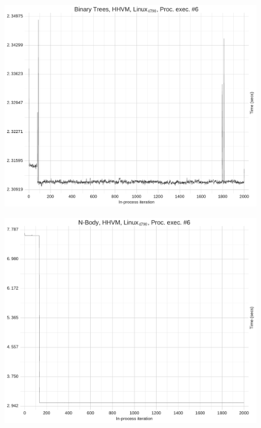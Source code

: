 \documentclass[preprint,numbers,10pt]{sigplanconf}
\begin{document}
\begin{figure}[h]
\centering
\includegraphics[width=.45\textwidth]{category_examples/warmup/warmup3.pdf}
\end{figure}
\begin{figure}[h]
\centering
\includegraphics[width=.45\textwidth]{category_examples/warmup/warmup4.pdf}
\end{figure}

\clearpage
\end{document}

